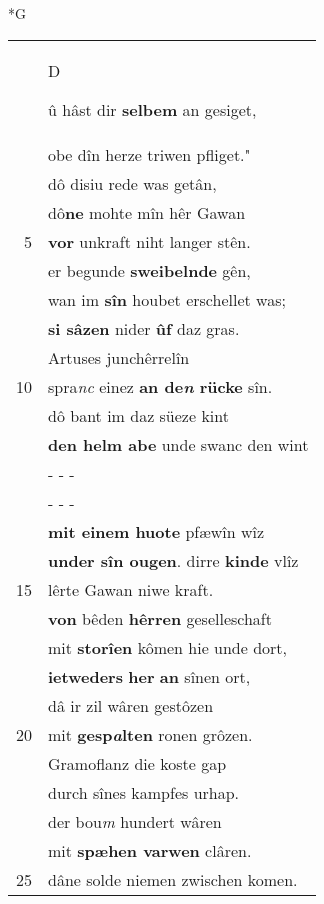 \documentclass[8pt,a4paper,notitlepage]{article}
\begin{document}
\begin{table}[ht]
\begin{minipage}[t]{0.5\linewidth}
\small
\begin{center}*G
\end{center}
\begin{tabular}{rl}
 & \begin{large}D\end{large}û hâst dir \textbf{selbem} an gesiget,\\ 
 & obe dîn herze triwen pfliget."\\ 
 & dô disiu rede was getân,\\ 
 & dô\textbf{ne} mohte mîn hêr Gawan\\ 
5 & \textbf{vor} unkraft niht langer stên.\\ 
 & er begunde \textbf{sweibelnde} gên,\\ 
 & wan im \textbf{sîn} houbet erschellet was;\\ 
 & \textbf{si sâzen} nider \textbf{ûf} daz gras.\\ 
 & Artuses junchêrrelîn\\ 
10 & spra\textit{nc} einez \textbf{an de\textit{n} rücke} sîn.\\ 
 & dô bant im daz süeze kint\\ 
 & \textbf{den helm abe} unde swanc den wint\\ 
 & \multicolumn{1}{l}{ - - - }\\ 
 & \multicolumn{1}{l}{ - - - }\\ 
 & \textbf{mit einem huote} pfæwîn wîz\\ 
 & \textbf{under sîn ougen}. dirre \textbf{kinde} vlîz\\ 
15 & lêrte Gawan niwe kraft.\\ 
 & \textbf{von} bêden \textbf{hêrren} geselleschaft\\ 
 & mit \textbf{storîen} kômen hie unde dort,\\ 
 & \textbf{ietweders} \textbf{her} \textbf{an} sînen ort,\\ 
 & dâ ir zil wâren gestôzen\\ 
20 & mit \textbf{gesp\textit{a}lten} ronen grôzen.\\ 
 & Gramoflanz die koste gap\\ 
 & durch sînes kampfes urhap.\\ 
 & der bou\textit{m} hundert wâren\\ 
 & mit \textbf{spæhen varwen} clâren.\\ 
25 & dâne solde niemen zwischen komen.\\ 

\end{tabular}
\end{minipage}
\end{table}
\end{document}
